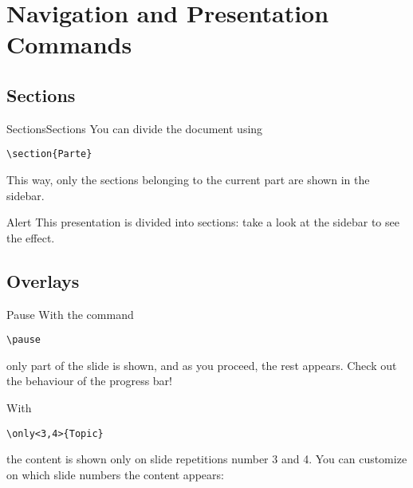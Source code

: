 
\section{Navigation and Presentation Commands}
\subsection{Sections}
    
\begin{frame}[fragile]{Sections}{Sections}
You can divide the document using
    \begin{verbatim}\section{Parte}\end{verbatim}
This way, only the sections belonging to the current part are shown in the sidebar.
\vspace{.5cm}
   \begin{alertblock}{Alert}
This presentation is divided into sections: take a look at the sidebar to see the effect.
    \end{alertblock}
\end{frame}





\subsection{Overlays}

\begin{frame}[fragile]{Pause}
    With the command
    \begin{verbatim}\pause\end{verbatim}
    only part of the slide is shown,
    \pause
    and as you proceed, the rest appears. Check out the behaviour of the progress bar!
    
    With
    \begin{verbatim}\only<3,4>{Topic}\end{verbatim}
    the content is shown only on slide repetitions number 3 and 4. You can customize on which slide numbers the content appears:\newline
    \pause
    
    \noindent{}
\end{frame}


